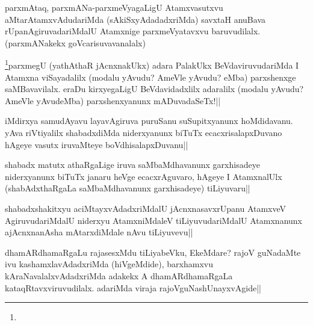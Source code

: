 \begin{artha} 
parxmAtaq, parxmANa-parxmeVyagaLigU Atamxvasutxvu 
aMtarAtamxvAdudariMda (sAkiSxyAdadadxriMda) savxtaH anuBava 
rUpanAgiruvadariMdalU Atamxnige parxmeVyatavxvu baruvudilalx. 
(parxmANakekx goVcarisuvavanalalx)
\end{artha}


\begin{artha} 
\footnote[1]{}parxmegU (yathAthaR jAcnxnakUkx) adara PalakUkx 
BeVdaviruvudariMda I Atamxna viSayadalilx (modalu yAvudu? AmeVle 
yAvudu? eMba) parxshenxge saMBavavilalx. eraDu kirxyegaLigU 
BeVdavidadxlilx adaralilx (modalu yAvudu? AmeVle yAvudeMba) 
parxshenxyanunx mADuvadaSeTx!||
\end{artha}


\begin{artha} 
iMdirxya samudAyavu layavAgiruva puruSanu suSupitxyanunx hoMdidavanu. 
yAva riVtiyalilx shabadxdiMda niderxyanunx biTuTx ecacxrisalapxDuvano 
hAgeye vasutx iruvaMteye boVdhisalapxDuvanu||
\end{artha}


\begin{artha} 
shabadx matutx athaRgaLige iruva saMbaMdhavanunx garxhisadeye 
niderxyanunx biTuTx janaru heVge ecacxrAguvaro, hAgeye I AtamxnalUlx 
(shabAdxthaRgaLa saMbaMdhavanunx garxhisadeye) tiLiyuvaru||
\end{artha}

\begin{artha} 
shabadxshakitxyu aciMtayxvAdadxriMdalU jAcnxnasavxrUpanu AtamxveV 
AgiruvudariMdalU niderxyu AtamxniMdaleV tiLiyuvudariMdalU 
Atamxnanunx ajAcnxnanAsha mAtarxdiMdale nAvu tiLiyuvevu||
\end{artha}


\begin{artha} 
dhamARdhamaRgaLu rajasesxMdu tiLiyabeVku, EkeMdare? rajoV guNadaMte 
ivu kashamxlavAdadxriMda (hiVgeMdide), barxhamxvu 
kAraNavalalxvAdadxriMda adakekx A dhamARdhamaRgaLa 
kataqRtavxviruvudilalx. adariMda viraja rajoVguNashUnayxvAgide||
\end{artha}

